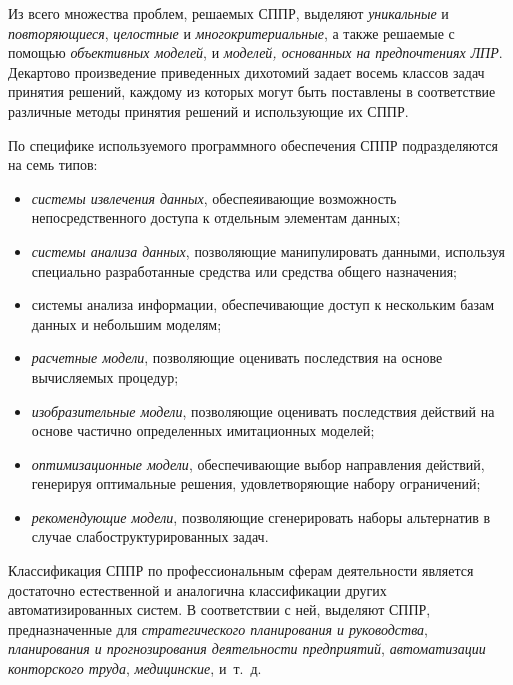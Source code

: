Из всего множества проблем, решаемых СППР, выделяют \emph{уникальные} и \emph{повторяющиеся},
\emph{целостные} и \emph{многокритериальные}, а также решаемые с помощью \emph{объективных моделей},
и \emph{моделей, основанных на предпочтениях ЛПР}. Декартово произведение приведенных дихотомий
задает восемь классов задач принятия решений, каждому из которых могут быть поставлены в соответствие
различные методы принятия решений и использующие их СППР.

По специфике используемого программного обеспечения СППР подразделяются на семь типов:
\begin{itemize}
\item \emph{системы извлечения данных}, обеспеяивающие возможность непосредственного
  доступа к отдельным элементам данных;
\item \emph{системы анализа данных}, позволяющие манипулировать данными,
  используя специально разработанные средства или средства общего назначения;
\item системы анализа информации, обеспечивающие доступ к нескольким базам данных
  и небольшим моделям;
\item \emph{расчетные модели}, позволяющие оценивать последствия на основе вычисляемых процедур;
\item \emph{изобразительные модели}, позволяющие оценивать последствия действий на основе
  частично определенных имитационных моделей;
\item \emph{оптимизационные модели}, обеспечивающие выбор направления действий,
  генерируя оптимальные решения, удовлетворяющие набору ограничений;
\item \emph{рекомендующие модели}, позволяющие сгенерировать наборы альтернатив
  в случае слабоструктурированных задач.
\end{itemize}

Классификация СППР по профессиональным сферам деятельности является
достаточно естественной и аналогична классификации других автоматизированных систем.
В соответствии с ней, выделяют СППР, предназначенные для
\emph{стратегического планирования и руководства},
\emph{планирования и прогнозирования деятельности предприятий},
\emph{автоматизации конторского труда},
\emph{медицинские}, и~т.~д.